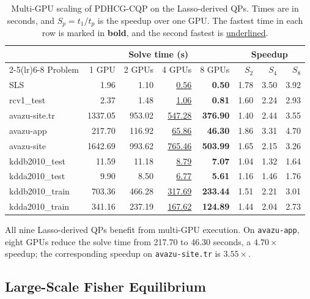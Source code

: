 \documentclass[letterpaper]{article} %
\newcommand{\name}{PDHCG-CQP\xspace}
\theoremstyle{definition}
\theoremstyle{remark}
\newcommand{\papertablesetup}{\small\setstretch{1.0}\renewcommand{\arraystretch}{1.2}}
\begin{document}
\begin{table}[htbp]
    \centering
  \papertablesetup
    \caption{Multi-GPU scaling of \name on the Lasso-derived QPs. Times are in
    seconds, and $S_p=t_1/t_p$ is the speedup over one GPU. The fastest time in
    each row is marked in \textbf{bold}, and the second fastest is
    \underline{underlined}.}
    \label{tab:lasso-scaling}
    \medskip
    \begin{tabular}{lrrrrrrr}
        \toprule
        & \multicolumn{4}{c}{Solve time (s)}
        & \multicolumn{3}{c}{Speedup}\\
        \cmidrule(lr){2-5}\cmidrule(lr){6-8}
        Problem & 1 GPU & 2 GPUs & 4 GPUs & 8 GPUs
            & $S_2$ & $S_4$ & $S_8$\\
        \midrule
        SLS               & 1.96    & 1.10   & \underline{0.56}   & \textbf{0.50}   & 1.78 & 3.50 & 3.92\\
        rcv1\_test        & 2.37    & 1.48   & \underline{1.06}   & \textbf{0.81}   & 1.60 & 2.24 & 2.93\\
        avazu-site.tr     & 1337.05 & 953.02 & \underline{547.28} & \textbf{376.90} & 1.40 & 2.44 & 3.55\\
        avazu-app         & 217.70  & 116.92 & \underline{65.86}  & \textbf{46.30}  & 1.86 & 3.31 & 4.70\\
        avazu-site        & 1642.69 & 993.62 & \underline{765.46} & \textbf{503.99} & 1.65 & 2.15 & 3.26\\
        kddb2010\_test    & 11.59   & 11.18  & \underline{8.79}   & \textbf{7.07}   & 1.04 & 1.32 & 1.64\\
        kdda2010\_test    & 9.90    & 8.50   & \underline{6.77}   & \textbf{5.61}   & 1.16 & 1.46 & 1.76\\
        kddb2010\_train   & 703.36  & 466.28 & \underline{317.69} & \textbf{233.44} & 1.51 & 2.21 & 3.01\\
        kdda2010\_train   & 341.16  & 237.19 & \underline{167.62} & \textbf{124.89} & 1.44 & 2.04 & 2.73\\
        \bottomrule
    \end{tabular}
\end{table}

All nine Lasso-derived QPs benefit from multi-GPU execution. On
\texttt{avazu-app}, eight GPUs reduce the solve time from 217.70 to 46.30
seconds, a $4.70\times$ speedup; the corresponding speedup on
\texttt{avazu-site.tr} is $3.55\times$.

\subsection{Large-Scale Fisher Equilibrium}
\label{sec:fisher-multigpu-exp}
\end{document}
